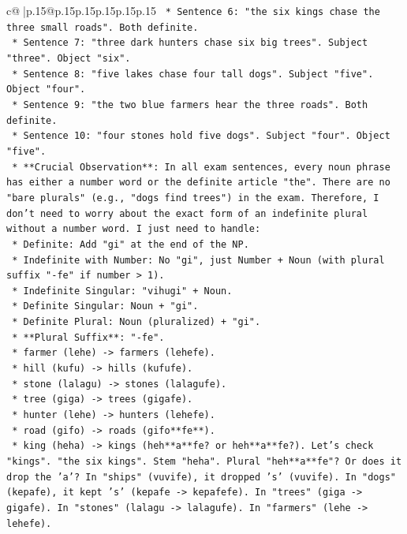 \documentclass{article}
\begin{document}
{\begin{supertabular}{c@{$\;$}|p{.15\linewidth}@{}p{.15\linewidth}p{.15\linewidth}p{.15\linewidth}p{.15\linewidth}p{.15\linewidth}}
{{{\texttt{        *   Sentence 6: "the six kings chase the three small roads". Both definite.} \\
\texttt{        *   Sentence 7: "three dark hunters chase six big trees". Subject "three". Object "six".} \\
\texttt{        *   Sentence 8: "five lakes chase four tall dogs". Subject "five". Object "four".} \\
\texttt{        *   Sentence 9: "the two blue farmers hear the three roads". Both definite.} \\
\texttt{        *   Sentence 10: "four stones hold five dogs". Subject "four". Object "five".} \\
\texttt{    *   **Crucial Observation**: In all exam sentences, every noun phrase has either a number word or the definite article "the". There are no "bare plurals" (e.g., "dogs find trees") in the exam. Therefore, I don't need to worry about the exact form of an indefinite plural without a number word. I just need to handle:} \\
\texttt{        *   Definite: Add "gi" at the end of the NP.} \\
\texttt{        *   Indefinite with Number: No "gi", just Number + Noun (with plural suffix "{-}fe" if number > 1).} \\
\texttt{        *   Indefinite Singular: "vihugi" + Noun.} \\
\texttt{        *   Definite Singular: Noun + "gi".} \\
\texttt{        *   Definite Plural: Noun (pluralized) + "gi".} \\
\texttt{    *   **Plural Suffix**: "{-}fe".} \\
\texttt{        *   farmer (lehe) {-}> farmers (lehefe).} \\
\texttt{        *   hill (kufu) {-}> hills (kufufe).} \\
\texttt{        *   stone (lalagu) {-}> stones (lalagufe).} \\
\texttt{        *   tree (giga) {-}> trees (gigafe).} \\
\texttt{        *   hunter (lehe) {-}> hunters (lehefe).} \\
\texttt{        *   road (gifo) {-}> roads (gifo**fe**).} \\
\texttt{        *   king (heha) {-}> kings (heh**a**fe? or heh**a**fe?). Let's check "kings". "the six kings". Stem "heha". Plural "heh**a**fe"? Or does it drop the 'a'? In "ships" (vuvife), it dropped 's' (vuvife). In "dogs" (kepafe), it kept 's' (kepafe {-}> kepafefe). In "trees" (giga {-}> gigafe). In "stones" (lalagu {-}> lalagufe). In "farmers" (lehe {-}> lehefe).} \\
}}}
\end{supertabular}}
\end{document}
